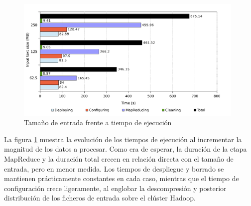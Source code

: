 \begin{figure}[tbp]
\begin{center}
\includegraphics[width=0.98\textwidth]{imagenes/042.pdf}
\caption{Tama\~no de entrada frente a tiempo de ejecuci\'on}
\label{fig:evotemporal}
\end{center}
\end{figure}

La figura \ref{fig:evotemporal} muestra la evoluci\'on de los tiempos de ejecuci\'on al incrementar la magnitud de los datos a procesar. Como era de esperar, la duraci\'on de la etapa MapReduce y la duraci\'on total crecen en relaci\'on directa con el tama\~no de entrada, pero en menor medida. Los tiempos de despliegue y bo\-rra\-do se mantienen pr\'acticamente constantes en cada caso, mientras que el tiempo de configuraci\'on crece ligeramente, al englobar la descompresi\'on y posterior distribuci\'on de los ficheros de entrada sobre el cl\'uster Hadoop.
